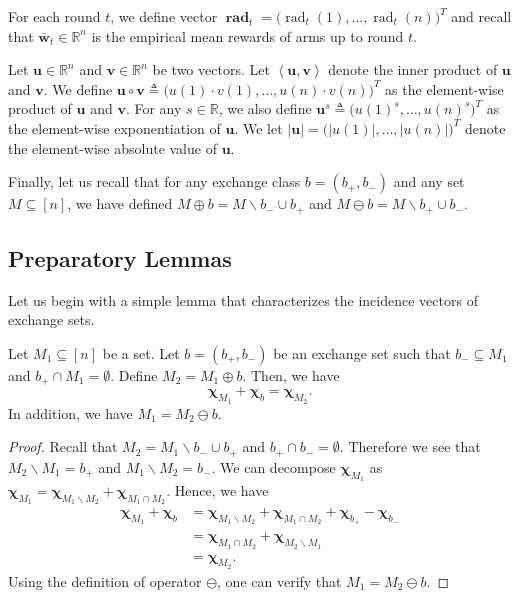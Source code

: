 \documentclass{article}
\newcommand{\del}{\backslash}
\newcommand{\RR}{\mathbb R}
\DeclareMathOperator{\rad}{rad}
\newcommand{\inn}[1]{\left\langle #1 \right\rangle}
\renewcommand{\vec}[1]{\boldsymbol{#1}}
\renewcommand{\odot}{\circ}
\begin{document}
For each round $t$, we define vector $\vec\rad_t = \big(\rad_t(1),\ldots,\rad_t(n)\big)^T$ and recall that $\vec {\bar w}_t\in \RR^n$ is the empirical mean rewards of arms up to round $t$.

Let $\vec u\in \RR^n$ and $\vec v\in \RR^n$ be two vectors.
Let $\inn{\vec u, \vec v}$ denote the inner product of $\vec u$ and $\vec v$.
We define $\vec u \odot \vec v \triangleq \big(u(1)\cdot v(1),\ldots,u(n)\cdot v(n)\big)^T$ as the element-wise product of $\vec u$ and $\vec v$.
For any $s\in \RR$, we also define $\vec u^s \triangleq \big(u(1)^s, \ldots, u(n)^s)^T$ as the element-wise exponentiation of $\vec u$.
We let $|\vec u| = \big(|u(1)|, \ldots, |u(n)|\big)^T$ denote the element-wise absolute value of $\vec u$.

Finally, let us recall that for any exchange class $b=(b_+,b_-)$ and any set $M\subseteq [n]$, we have defined
$M\oplus b = M\del b_- \cup b_+$ and $M\ominus b = M \del b_+ \cup b_-$.


\subsection{Preparatory Lemmas}
Let us begin with a simple lemma that characterizes the incidence vectors of exchange sets.
\begin{lemma}
Let $M_1 \subseteq [n]$ be a set.
Let $b=(b_+,b_-)$ be an exchange set such that 
$b_-\subseteq M_1$ and $b_+ \cap M_1 = \emptyset$.
Define $M_2 = M_1 \oplus b$.
Then, we have 
$$
\vec\chi_{M_1} +\vec\chi_{b} = \vec\chi_{M_2}.
$$
In addition, we have $M_1 = M_2 \ominus b$.
\label{lemma:exchange-char}
\end{lemma}

\begin{proof}
Recall that $M_2 = M_1 \del b_- \cup b_+$ and $b_+\cap b_-=\emptyset$.
Therefore we see that $M_2 \del M_1 = b_+$ and $M_1 \del M_2 = b_-$.
We can decompose $\vec\chi_{M_1}$ as $\vec\chi_{M_1}=\vec\chi_{M_1\del M_2}+\vec\chi_{M_1\cap M_2}$.
Hence, we have
\begin{align*}
   \vec\chi_{M_1}+\vec\chi_{b} &= \vec\chi_{M_1\del M_2}+\vec\chi_{M_1\cap M_2} + \vec\chi_{b_+}-\vec\chi_{b_-}\\
   							   &= \vec\chi_{M_1\cap M_2} + \vec\chi_{M_2\del M_1}\\
   							   &= \vec\chi_{M_2}.
\end{align*}
Using the definition of operator $\ominus$, one can verify that $M_1 = M_2 \ominus b$.
\end{proof}
\end{document}
